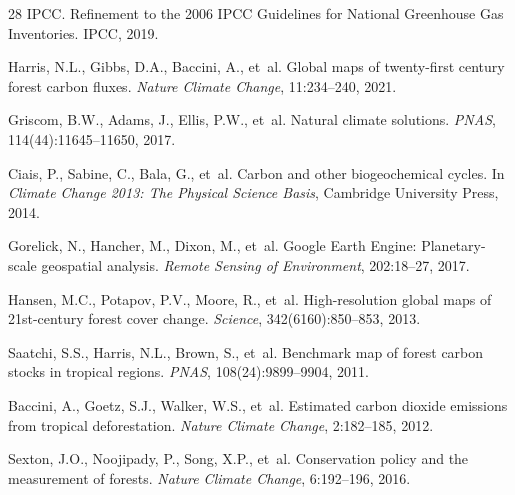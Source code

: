 \begin{thebibliography}{28}
IPCC.
 Refinement to the 2006 IPCC Guidelines for National Greenhouse
  Gas Inventories.
\newblock IPCC, 2019.

Harris, N.L., Gibbs, D.A., Baccini, A., et~al.
\newblock Global maps of twenty-first century forest carbon fluxes.
\newblock \emph{Nature Climate Change}, 11:234--240, 2021.

Griscom, B.W., Adams, J., Ellis, P.W., et~al.
\newblock Natural climate solutions.
\newblock \emph{PNAS}, 114(44):11645--11650, 2017.

Ciais, P., Sabine, C., Bala, G., et~al.
\newblock Carbon and other biogeochemical cycles.
\newblock In \emph{Climate Change 2013: The Physical Science Basis},
  Cambridge University Press, 2014.

Gorelick, N., Hancher, M., Dixon, M., et~al.
\newblock Google Earth Engine: Planetary-scale geospatial analysis.
\newblock \emph{Remote Sensing of Environment}, 202:18--27, 2017.

Hansen, M.C., Potapov, P.V., Moore, R., et~al.
\newblock High-resolution global maps of 21st-century forest cover change.
\newblock \emph{Science}, 342(6160):850--853, 2013.

Saatchi, S.S., Harris, N.L., Brown, S., et~al.
\newblock Benchmark map of forest carbon stocks in tropical regions.
\newblock \emph{PNAS}, 108(24):9899--9904, 2011.

Baccini, A., Goetz, S.J., Walker, W.S., et~al.
\newblock Estimated carbon dioxide emissions from tropical deforestation.
\newblock \emph{Nature Climate Change}, 2:182--185, 2012.

Sexton, J.O., Noojipady, P., Song, X.P., et~al.
\newblock Conservation policy and the measurement of forests.
\newblock \emph{Nature Climate Change}, 6:192--196, 2016.

\end{thebibliography}

